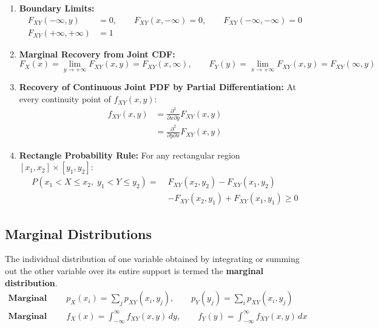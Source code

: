 \documentclass[12pt,a4paper]{article}
\begin{document}
\begin{tcolorbox}[formulabox, title={\textbf{Properties of the Joint CDF and Recovery of Joint PDF}}]
\begin{enumerate}[leftmargin=*, itemsep=3pt]
  \item \textbf{Boundary Limits:}
  \begin{align}
    F_{XY}(-\infty, y) &= 0, \qquad F_{XY}(x, -\infty) = 0, \qquad F_{XY}(-\infty, -\infty) = 0 \\[2pt]
    F_{XY}(+\infty, +\infty) &= 1
  \end{align}
  \item \textbf{Marginal Recovery from Joint CDF:}
  \begin{equation}
    F_X(x) = \lim_{y \to +\infty} F_{XY}(x, y) = F_{XY}(x, \infty), \qquad F_Y(y) = \lim_{x \to +\infty} F_{XY}(x, y) = F_{XY}(\infty, y)
  \end{equation}
  \item \textbf{Recovery of Continuous Joint PDF by Partial Differentiation:}
  At every continuity point of $f_{XY}(x, y)$:
  \begin{equation}
    \begin{aligned}
      f_{XY}(x, y) &= \frac{\partial^2}{\partial x \partial y} F_{XY}(x, y) \\[3pt]
      &= \frac{\partial^2}{\partial y \partial x} F_{XY}(x, y)
    \end{aligned}
  \end{equation}
  \item \textbf{Rectangle Probability Rule:} For any rectangular region $[x_1, x_2] \times [y_1, y_2]$:
  \begin{align}
    P(x_1 < X \le x_2, \; y_1 < Y \le y_2) = \; & F_{XY}(x_2, y_2) - F_{XY}(x_1, y_2) \nonumber \\[2pt]
                                                & - F_{XY}(x_2, y_1) + F_{XY}(x_1, y_1) \ge 0
  \end{align}
\end{enumerate}
\end{tcolorbox}

\subsection{Marginal Distributions}
The individual distribution of one variable obtained by integrating or summing out the other variable over its entire support is termed the \textbf{marginal distribution}.
\begin{align}
  \textbf{Marginal PMFs:} \quad & p_X(x_i) = \sum_{j} p_{XY}(x_i, y_j), \qquad p_Y(y_j) = \sum_{i} p_{XY}(x_i, y_j) \\[4pt]
  \textbf{Marginal PDFs:} \quad & f_X(x) = \int_{-\infty}^\infty f_{XY}(x, y) \, dy, \qquad f_Y(y) = \int_{-\infty}^\infty f_{XY}(x, y) \, dx
\end{align}
\end{document}
